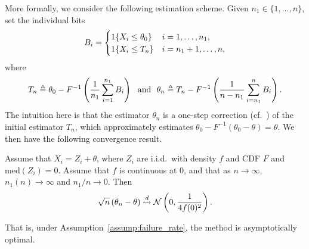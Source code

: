 More formally, we consider the following estimation scheme. Given
$n_1 \in \{1, \ldots, n\}$,
set the individual bits
\begin{equation*}
  B_i =
  \begin{cases}
    1\!\left\{X_i \le \theta_0\right\} & i = 1,\ldots,n_1, \\
    1\!\left\{X_i \le T_n\right\}& i={n_1+1,\ldots,n},
  \end{cases}
\end{equation*}
where
\begin{equation*}
  T_n \triangleq \theta_0 - F^{-1}\left(
  \frac{1}{n_1} \sum_{i=1}^{n_1} B_i 
  \right)
  ~~ \mbox{and} ~~
  \theta_n \triangleq
  T_n - F^{-1} \left(\frac{1}{n - n_1}
  \sum_{i = n_1}^n B_i \right).
\end{equation*} 
The intuition here is that the estimator $\theta_n$ is a one-step
correction (cf.~\cite[Thm.~6.4.3]{LehmannCa98}) of the initial estimator
$T_n$, which approximately estimates
$\theta_0 - F^{-1}(\theta_0 - \theta) = \theta$. We then have the
following convergence result.
\begin{thm}
  Assume that $X_i = Z_i + \theta$, where $Z_i$ are i.i.d.\
  with density $f$ and CDF $F$ and $\mbox{med}(Z_i) = 0$. Assume that
  $f$ is continuous at 0, and that as $n \to \infty$,
  $n_1(n) \rightarrow \infty$ and $n_1 / n \to
  0$. Then
  \begin{align*}
    \sqrt{n} \left( {\theta}_n - \theta  \right)
    \stackrel{d}{\rightsquigarrow}  \mathcal{N}\left( 0, \frac{1}{4 f(0)^2}\right).
  \end{align*}
\end{thm}
\noindent
That is, under Assumption~\ref{assump:failure_rate}, the method is
asymptotically optimal.
%
